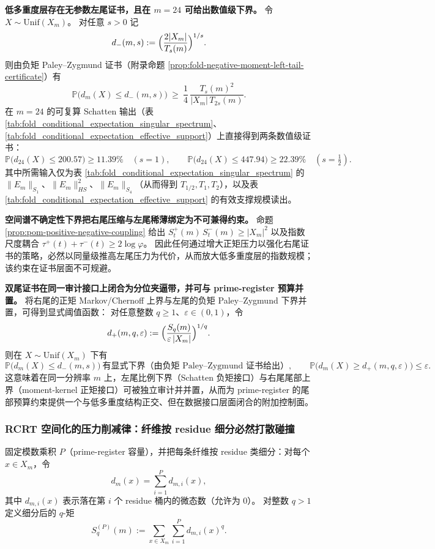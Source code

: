 \medskip\noindent\textbf{低多重度层存在无参数左尾证书，且在 \(m=24\) 可给出数值级下界。}
令 \(X\sim \mathrm{Unif}(X_m)\)。
对任意 \(s>0\) 记
\[
d_{-}(m,s):=\Bigl(\frac{2|X_m|}{T_s(m)}\Bigr)^{1/s}.
\]
则由负矩 Paley--Zygmund 证书（附录命题 \ref{prop:fold-negative-moment-left-tail-certificate}）有
\[
\mathbb{P}\bigl(d_m(X)\le d_{-}(m,s)\bigr)\ \ge\ \frac14\,\frac{T_s(m)^2}{|X_m|\,T_{2s}(m)}.
\]
在 \(m=24\) 的可复算 Schatten 输出（表 \ref{tab:fold_conditional_expectation_singular_spectrum}、\ref{tab:fold_conditional_expectation_effective_support}）上直接得到两条数值级证书：
\[
\mathbb{P}\bigl(d_{24}(X)\le 200.57\bigr)\ge 11.39\% \quad(s=1),
\qquad
\mathbb{P}\bigl(d_{24}(X)\le 447.94\bigr)\ge 22.39\% \quad(s=\tfrac12).
\]
其中所需输入仅为表 \ref{tab:fold_conditional_expectation_singular_spectrum} 的 \(\|E_m\|_{S_1}\)、\(\|E_m\|_{HS}^2\)、\(\|E_m\|_{S_4}\)（从而得到 \(T_{1/2},T_1,T_2\)），以及表 \ref{tab:fold_conditional_expectation_effective_support} 的有效支撑规模读出。

\medskip\noindent\textbf{空间谱不确定性下界把右尾压缩与左尾稀薄绑定为不可兼得约束。}
命题 \ref{prop:pom-positive-negative-coupling} 给出
\(
S_t^+(m)\,S_t^-(m)\ge |X_m|^2
\)
以及指数尺度耦合
\(
\tau^{+}(t)+\tau^{-}(t)\ge 2\log\varphi
\)。
因此任何通过增大正矩压力以强化右尾证书的策略，必然以同量级推高左尾压力为代价，从而放大低多重度层的指数规模；该约束在证书层面不可规避。

\medskip\noindent\textbf{双尾证书在同一审计接口上闭合为分位夹逼带，并可与 prime-register 预算并置。}
将右尾的正矩 Markov/Chernoff 上界与左尾的负矩 Paley--Zygmund 下界并置，可得到显式阈值函数：
对任意整数 \(q\ge 1\)、\(\varepsilon\in(0,1)\)，令
\[
d_{+}(m,q,\varepsilon):=\Bigl(\frac{S_q(m)}{\varepsilon\,|X_m|}\Bigr)^{1/q}.
\]
则在 \(X\sim \mathrm{Unif}(X_m)\) 下有
\[
\mathbb{P}\bigl(d_m(X)\le d_{-}(m,s)\bigr)\ \text{有显式下界（由负矩 Paley--Zygmund 证书给出）},
\qquad
\mathbb{P}\bigl(d_m(X)\ge d_{+}(m,q,\varepsilon)\bigr)\le \varepsilon.
\]
这意味着在同一分辨率 \(m\) 上，左尾比例下界（Schatten 负矩接口）与右尾尾部上界（moment-kernel 正矩接口）可被独立审计并并置，从而为 prime-register 的尾部预算约束提供一个与低多重度结构正交、但在数据接口层面闭合的附加控制面。

\subsubsection{RCRT 空间化的压力削减律：纤维按 residue 细分必然打散碰撞}\label{subsec:pom-rcrt-pressure-reduction}
\begin{definition}\label{def:pom-residue-refined-moment}
固定模数乘积 \(P\)（prime-register 容量），并把每条纤维按 residue 类细分：对每个 \(x\in X_m\)，令
$$
d_m(x)=\sum_{i=1}^{P} d_{m,i}(x),
$$
其中 \(d_{m,i}(x)\) 表示落在第 \(i\) 个 residue 桶内的微态数（允许为 \(0\)）。
对整数 \(q>1\) 定义细分后的 \(q\)-矩
$$
S_q^{(P)}(m):=\sum_{x\in X_m}\sum_{i=1}^{P} d_{m,i}(x)^q.
$$
\end{definition}

